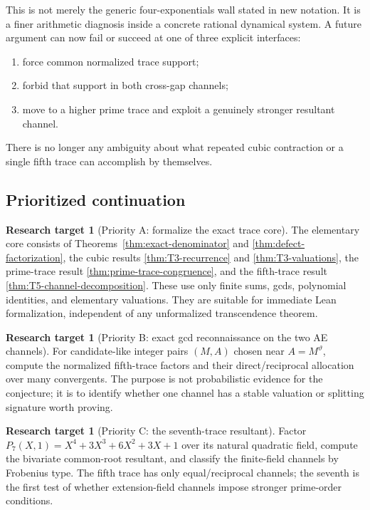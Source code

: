 \documentclass[11pt,oneside]{article}
\theoremstyle{definition}
\newtheorem{target}[theorem]{Research target}
\theoremstyle{remark}
\newcommand{\thetaAE}{\vartheta}
\begin{document}
This is not merely the generic four-exponentials wall stated in new notation.  It is a finer
arithmetic diagnosis inside a concrete rational dynamical system.  A future argument can now
fail or succeed at one of three explicit interfaces:
\begin{enumerate}
\item force common normalized trace support;
\item forbid that support in both cross-gap channels;
\item move to a higher prime trace and exploit a genuinely stronger resultant channel.
\end{enumerate}
There is no longer any ambiguity about what repeated cubic contraction or a single fifth
trace can accomplish by themselves.

\subsection{Prioritized continuation}

\begin{target}[Priority A: formalize the exact trace core]
The elementary core consists of
Theorems~\ref{thm:exact-denominator} and \ref{thm:defect-factorization}, the cubic results
\ref{thm:T3-recurrence} and \ref{thm:T3-valuations}, the prime-trace result
\ref{thm:prime-trace-congruence}, and the fifth-trace result
\ref{thm:T5-channel-decomposition}.  These use only finite sums, gcds, polynomial identities,
and elementary valuations.  They are suitable for immediate Lean
formalization, independent of any unformalized transcendence theorem.
\end{target}

\begin{target}[Priority B: exact gcd reconnaissance on the two AE channels]
For candidate-like integer pairs \((M,A)\) chosen near \(A=M^{\thetaAE}\), compute the
normalized fifth-trace factors and their direct/reciprocal allocation over many convergents.
The purpose is not probabilistic evidence for the conjecture; it is to identify whether one
channel has a stable valuation or splitting signature worth proving.
\end{target}

\begin{target}[Priority C: the seventh-trace resultant]
Factor \(P_7(X,1)=X^4+3X^3+6X^2+3X+1\) over its natural quadratic field, compute the
bivariate common-root resultant, and classify the finite-field channels by Frobenius type.
The fifth trace has only equal/reciprocal channels; the seventh is the first test of whether
extension-field channels impose stronger prime-order conditions.
\end{target}
\end{document}
